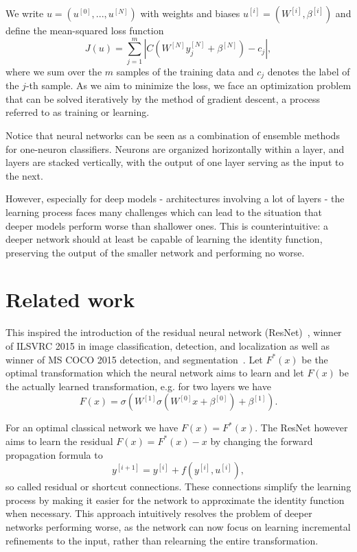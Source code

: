 \documentclass{article}
\begin{document}
We write $u=(u^{[0]}, ..., u^{[N]})$ with weights and biases $u^{[i]} = (W^{[i]}, \beta^{[i]})$ and define the mean-squared loss function 
$$
J(u) = \sum_{j=1}^{m} |C(W^{[N]} y_{j}^{[N]} + \beta^{[N]}) - c_{j}|,
$$
where we sum over the $m$ samples of the training data and $c_j$ denotes the label of the $j$-th sample. As we aim to minimize the loss, we face an optimization problem that can be solved iteratively by the method of gradient descent, a process referred to as training or learning.

Notice that neural networks can be seen as a combination of ensemble methods for one-neuron classifiers. Neurons are organized horizontally within a layer, and layers are stacked vertically, with the output of one layer serving as the input to the next.

However, especially for deep models - architectures involving a lot of layers - the learning process faces many challenges which can lead to the situation that deeper models perform worse than shallower ones. This is counterintuitive: a deeper network should at least be capable of learning the identity function, preserving the output of the smaller network and performing no worse.

\section{Related work}
This inspired the introduction of the residual neural network (ResNet)~\citep{he2016}, winner of ILSVRC 2015 in image classification, detection, and localization as well as winner of MS COCO 2015 detection, and segmentation~\citep{tsang2018resnet}. Let $F^*(x)$ be the optimal transformation which the neural network aims to learn and let $F(x)$ be the actually learned transformation, e.g. for two layers we have
$$
F(x) = \sigma(W^{[1]} \sigma(W^{[0]} x + \beta^{[0]}) + \beta^{[1]}).
$$

For an optimal classical network we have $F(x) = F^*(x)$. The ResNet however aims to learn the residual $F(x) = F^*(x) - x$ by changing the forward propagation formula to 
$$
y^{[i+1]} = y^{[i]} + f(y^{[i]}, u^{[i]}),
$$
so called residual or shortcut connections. These connections simplify the learning process by making it easier for the network to approximate the identity function when necessary. This approach intuitively resolves the problem of deeper networks performing worse, as the network can now focus on learning incremental refinements to the input, rather than relearning the entire transformation.
\end{document}
